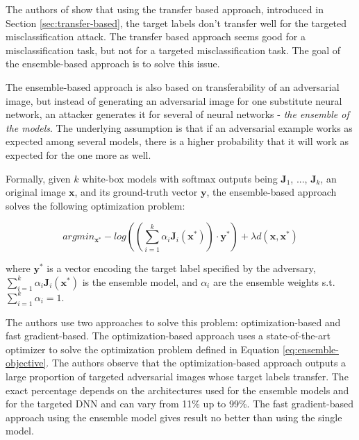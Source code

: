 The authors of \cite{ensemble-attack} show that using the transfer based approach, introduced in Section \ref{sec:transfer-based}, the target labels don't transfer well for the targeted misclassification attack. The transfer based approach seems good for a misclassification task, but not for a targeted misclassification task. The goal of the ensemble-based approach is to solve this issue.

The ensemble-based approach is also based on transferability of an adversarial image, but instead of generating an adversarial image for one substitute neural network, an attacker generates it for several of neural networks - \textit{the ensemble of the models}. The underlying assumption is that if an adversarial example works as expected among several models, there is a higher probability that it will work as expected for the one more as well. 

Formally, given $k$ white-box models with softmax outputs being $\pmb J_1$, ..., $\pmb J_k$, an original image $\pmb x$, and its ground-truth vector $\pmb y$, the ensemble-based approach solves the following optimization problem:

\begin{equation}\label{eq:ensemble-objective}
argmin_{\pmb x^*} - log ((\sum_{i=1}^k \alpha_i \pmb J_i(\pmb x^*)) \cdot \pmb y^*) + \lambda d(\pmb x, \pmb x^*)
\end{equation}

where $\pmb y^*$ is a vector encoding the target label specified by the adversary, $\sum_{i=1}^k \alpha_i \pmb J_i(\pmb x^*)$ is the ensemble model, and $\alpha_i$ are the ensemble weights s.t. $\sum_{i=1}^k \alpha_i = 1$.

The authors use two approaches to solve this problem: optimization-based and fast gradient-based. The optimization-based approach uses a state-of-the-art optimizer to solve the optimization problem defined in Equation \ref{eq:ensemble-objective}. The authors observe that the optimization-based approach outputs a large proportion of targeted adversarial images whose target labels transfer. The exact percentage depends on the architectures used for the ensemble models and for the targeted DNN and can vary from 11\% up to 99\%. The fast gradient-based approach using the ensemble model gives result no better than using the single model.